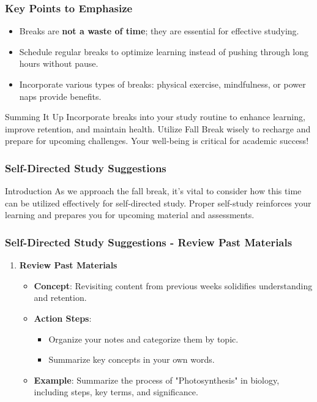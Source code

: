 \documentclass[aspectratio=169]{beamer}
\begin{document}
\begin{frame}[fragile]
    \frametitle{Key Points to Emphasize}
    \begin{itemize}
        \item Breaks are \textbf{not a waste of time}; they are essential for effective studying.
        \item Schedule regular breaks to optimize learning instead of pushing through long hours without pause.
        \item Incorporate various types of breaks: physical exercise, mindfulness, or power naps provide benefits.
    \end{itemize}
    
    \begin{block}{Summing It Up}
        Incorporate breaks into your study routine to enhance learning, improve retention, and maintain health. Utilize Fall Break wisely to recharge and prepare for upcoming challenges. Your well-being is critical for academic success!
    \end{block}
\end{frame}

\begin{frame}[fragile]
    \frametitle{Self-Directed Study Suggestions}
    \begin{block}{Introduction}
        As we approach the fall break, it’s vital to consider how this time can be utilized effectively for self-directed study. Proper self-study reinforces your learning and prepares you for upcoming material and assessments.
    \end{block}
\end{frame}

\begin{frame}[fragile]
    \frametitle{Self-Directed Study Suggestions - Review Past Materials}
    \begin{enumerate}
        \item \textbf{Review Past Materials}
        \begin{itemize}
            \item \textbf{Concept}: Revisiting content from previous weeks solidifies understanding and retention.
            \item \textbf{Action Steps}:
            \begin{itemize}
                \item Organize your notes and categorize them by topic.
                \item Summarize key concepts in your own words.
            \end{itemize}
            \item \textbf{Example}: Summarize the process of "Photosynthesis" in biology, including steps, key terms, and significance.
        \end{itemize}
    \end{enumerate}
\end{frame}
\end{document}
